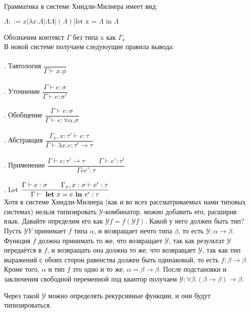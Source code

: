 	 \noindent Грамматика в системе Хиндли-Милнера имеет вид:\\
	 
	 \begin{center}
	 $\Lambda::=x | \lambda x.\Lambda | \Lambda\Lambda | (\Lambda) | \text{let x = }\Lambda \text{ in }\Lambda $ 
	 \end{center}
 		
 	 \noindent Обозначим контекст $\Gamma$ без типа x как $\Gamma_x$\\
 	 В новой системе получаем следуюущие правила вывода: \\ \\
 	 
 	 . Тавтология $\dfrac{}{\Gamma\vdash x.\phi}$ \\\\
 	
 	 . Уточнение $\dfrac{\Gamma\vdash e:\sigma}{\Gamma\vdash e:\sigma'}$ \\\\
 	 
 	 . Обобщение $\dfrac{\Gamma\vdash e:\sigma}{\Gamma\vdash e:\forall\alpha.\sigma}$ \\ \\
 	 . Абстракция $\dfrac{\Gamma_x, x:\tau'\vdash e:\tau}{\Gamma\vdash \lambda x.e:\tau'\rightarrow\tau}$ \\ \\
 	 . Применение $\dfrac{\Gamma\vdash e:\tau'\rightarrow\tau\qquad\Gamma\vdash e':\tau'}{\Gamma ee':\tau}$ \\ \\
 	 . Let $\dfrac{\Gamma\vdash e:\sigma\qquad\Gamma_x,x:\sigma\vdash e':\tau}{\Gamma\vdash\text{ \textbf{let} } x = e \textbf{ in }e':\tau}$ \\
 	 
 	 Хотя в системе Хиндли-Милнера (как и во всех рассматриваемых нами типовых системах) нельзя типизировать $\mathcal{Y} $-комбинатор,
 	 можно добавить его, расширив язык.
 	 Давайте определим его как $\mathcal{Y} f = f \left(\mathcal{Y} f\right)$.
 	 Какой у него должен быть тип? Пусть $\mathcal{Y}Y$ принимает $f$ типа $\alpha$, и возвращает нечто типа $\beta$,
 	 то есть $\mathcal{Y}: \alpha\to\beta$.
 	 Функция $f$ должна принимать то же, что возвращает $\mathcal{Y}$, так как результат $\mathcal{Y}$ передаётся в $f$,
 	 и возвращать она должна то же, что возвращает $\mathcal{Y}$, так как тип выражений с обоих сторон равенства должен быть одинаковый,
 	 то есть $f : \beta\to\beta$
 	 Кроме того, $\alpha$ и тип $f$ это одно и то же, $\alpha=\beta\to\beta$.
 	 После подстановки и заключения свободной переменной под квантор получаем $\mathcal{Y} : \forall\beta.(\beta\to\beta)\to\beta$.
 	 
 	 Через такой $\mathcal{Y}$ можно определять рекурсивные функции, и они будут типизироваться.
 	 
 
 	 

